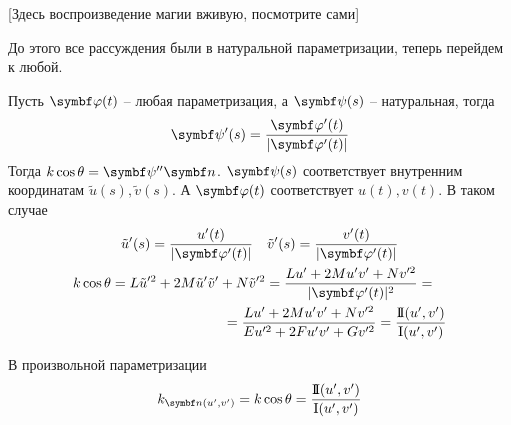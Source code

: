 \documentclass[main]{subfiles}
\begin{document}
[Здесь воспроизведение магии вживую, посмотрите сами]

До этого все рассуждения были в натуральной параметризации, теперь перейдем к любой.

Пусть $\vphi(t)$ -- любая параметризация, а $\vpsi(s)$ -- натуральная, тогда
\[\vpsi'(s) = \frac{\vphi'(t)}{|\vphi'(t)|}\]
Тогда  $k \cos\theta = \vpsi'' \vn$.
$\vpsi(s)$ соответствует внутренним координатам $\tilde{u}(s), \tilde{v}(s)$.
А $\vphi(t)$ соответствует $u(t), v(t)$.
В таком случае
\begin{gather*}
    \tilde{u}'(s) = \frac{u'(t)}{|\vphi'(t)|} \quad \tilde{v}'(s) =\frac{v'(t)}{|\vphi'(t)|}\\
    \begin{multlined}
        k \cos \theta = L \tilde{u}'^2 + 2M \tilde{u}' \tilde{v}' + N \tilde{v}'^2 = \frac{L u' + 2M u'v' + Nv'^2}{|\vphi'(t)|^2} =\\
        = \frac{L u' + 2M u'v' + Nv'^2}{Eu'^2 + 2F u'v' + G v'^2} = \frac{\sff(u',v')}{\fff(u',v')}
    \end{multlined}
\end{gather*}
\begin{theorem}
    В произвольной параметризации
    \[k_{\vn(u', v')} = k \cos \theta = \frac{\sff(u',v')}{\fff(u',v')}\]
\end{theorem}
\end{document}
